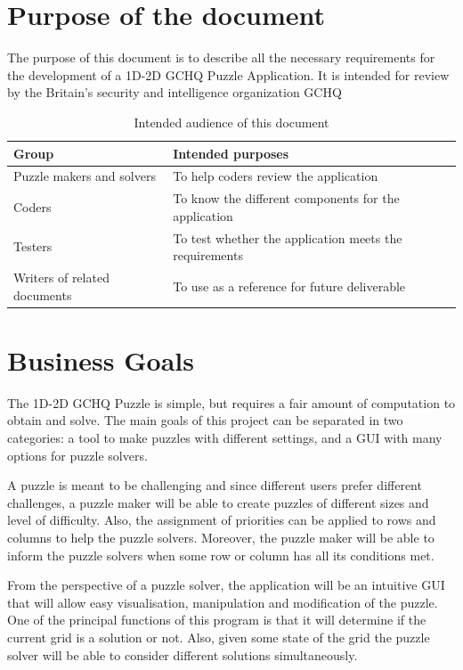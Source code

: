 \documentclass[12pt]{article}
\begin{document}
\clearpage

\tableofcontents

\clearpage

\section{Purpose of the document}
The purpose of this document is to describe all the necessary requirements for the development of a 1D-2D GCHQ Puzzle Application.
It is intended for review by the Britain's security and intelligence organization GCHQ
\begin{table}[htbp]
\caption{Intended audience of this document}
\begin{center}
\begin{tabular}{|l | l|}
\hline
Group & Intended purposes \\
\hline\hline
Puzzle makers and solvers & To help coders review the application \\
\hline
Coders & To know the different components for the application \\
\hline
Testers & To test whether the application meets the requirements \\
\hline
Writers of related documents & To use as a reference for future deliverable\\
\hline
\end{tabular}
\end{center}
\end{table}

\section{Business Goals}
\setlength{\parindent}{5ex}

The 1D-2D GCHQ Puzzle is simple, but requires a fair amount of computation to obtain and solve. The main goals of this project can be separated in two categories: a tool to make puzzles
with different settings, and a GUI with many options for puzzle solvers.

A puzzle is meant to be challenging and since different users prefer different challenges, a puzzle maker will be able to create puzzles of different sizes and level 
of difficulty. Also, the assignment of priorities can be applied to rows and columns to help the puzzle solvers. Moreover, the puzzle maker will be able to inform the puzzle solvers
when some row or column has all its conditions met.

From the perspective of a puzzle solver, the application will be an intuitive GUI that will allow easy visualisation, manipulation and modification of the puzzle. One of the principal functions
of this program is that it will determine if the current grid is a solution or not. Also, given some state of the grid the puzzle solver will be able to consider different solutions simultaneously.
\end{document}
